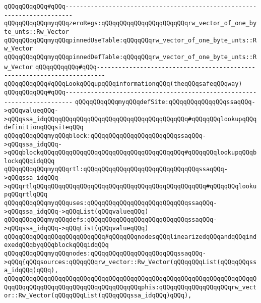 \verb|qQQqqQQqqQQq#qQQq------------------------------------------------------------------------|\newline
\verb|qQQqqQQqqQQqmyqQQqzeroRegs:qQQqqQQqqQQqqQQqqQQqqQQqrw_vector_of_one_byte_unts::Rw_Vector|\newline
\verb|qQQqqQQqqQQqmyqQQqpinnedUseTable:qQQqqQQqrw_vector_of_one_byte_unts::Rw_Vector|\newline
\verb|qQQqqQQqqQQqmyqQQqpinnedDefTable:qQQqqQQqrw_vector_of_one_byte_unts::Rw_Vector|\newline
\newline
\verb|qQQqqQQqqQQq#qQQq------------------------------------------------------------------------|\newline
\verb|qQQqqQQqqQQq#qQQqLookqQQqupqQQqinformationqQQq(theqQQqsafeqQQqway)|\newline
\verb|qQQqqQQqqQQq#qQQq------------------------------------------------------------------------|\newline
\verb|qQQqqQQqqQQqmyqQQqdefSite:qQQqqQQqqQQqqQQqssaqQQq->qQQqvalueqQQq->qQQqssa_idqQQqqQQqqQQqqQQqqQQqqQQqqQQqqQQqqQQqqQQq#qQQqqQQqlookupqQQqdefinitionqQQqsiteqQQq|\newline
\verb|qQQqqQQqqQQqmyqQQqblock:qQQqqQQqqQQqqQQqqQQqqQQqssaqQQq->qQQqssa_idqQQq->qQQqblockqQQqqQQqqQQqqQQqqQQqqQQqqQQqqQQqqQQqqQQq#qQQqqQQqlookupqQQqblockqQQqidqQQq|\newline
\verb|qQQqqQQqqQQqmyqQQqrtl:qQQqqQQqqQQqqQQqqQQqqQQqqQQqqQQqssaqQQq->qQQqssa_idqQQq->qQQqrtlqQQqqQQqqQQqqQQqqQQqqQQqqQQqqQQqqQQqqQQqqQQqqQQq#qQQqqQQqlookupqQQqrtlqQQq|\newline
\verb|qQQqqQQqqQQqmyqQQquses:qQQqqQQqqQQqqQQqqQQqqQQqqQQqssaqQQq->qQQqssa_idqQQq->qQQqList(qQQqvalueqQQq)|\newline
\verb|qQQqqQQqqQQqmyqQQqdefs:qQQqqQQqqQQqqQQqqQQqqQQqqQQqssaqQQq->qQQqssa_idqQQq->qQQqList(qQQqvalueqQQq)|\newline
\newline
\verb|qQQqqQQqqQQqqQQqqQQqqQQqqQQq#qQQqqQQqnodesqQQqlinearizedqQQqandqQQqindexedqQQqbyqQQqblockqQQqidqQQq|\newline
\verb|qQQqqQQqqQQqmyqQQqnodes:qQQqqQQqqQQqqQQqqQQqqQQqssaqQQq->qQQq{qQQqsources:qQQqqQQqrw_vector::Rw_Vector(qQQqqQQqList(qQQqqQQqssa_idqQQq)qQQq),|\newline
\verb|qQQqqQQqqQQqqQQqqQQqqQQqqQQqqQQqqQQqqQQqqQQqqQQqqQQqqQQqqQQqqQQqqQQqqQQqqQQqqQQqqQQqqQQqqQQqqQQqqQQqqQQqqQQqphis:qQQqqQQqqQQqqQQqqQQqrw_vector::Rw_Vector(qQQqqQQqList(qQQqqQQqssa_idqQQq)qQQq),|\newline
